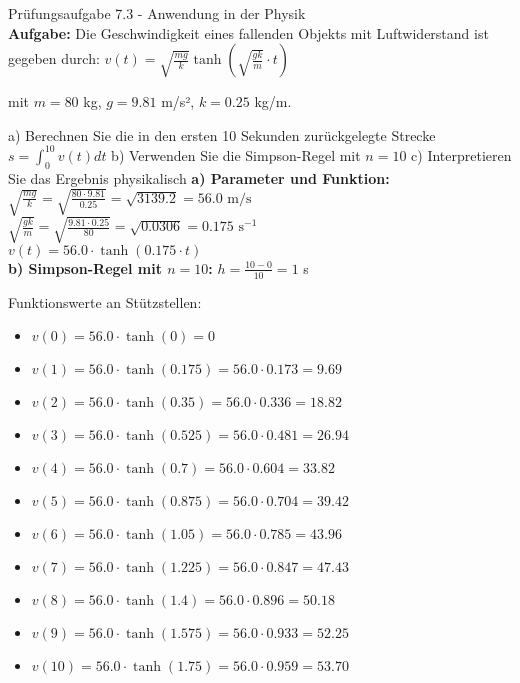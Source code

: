 \begin{example2}{Prüfungsaufgabe 7.3 - Anwendung in der Physik}\\
\textbf{Aufgabe:} Die Geschwindigkeit eines fallenden Objekts mit Luftwiderstand ist gegeben durch:
$v(t) = \sqrt{\frac{mg}{k}} \tanh\left(\sqrt{\frac{gk}{m}} \cdot t\right)$

mit $m = 80$ kg, $g = 9.81$ m/s², $k = 0.25$ kg/m.

a) Berechnen Sie die in den ersten 10 Sekunden zurückgelegte Strecke $s = \int_0^{10} v(t) dt$
b) Verwenden Sie die Simpson-Regel mit $n = 10$
c) Interpretieren Sie das Ergebnis physikalisch
\tcblower
\textbf{a) Parameter und Funktion:}\\
$\sqrt{\frac{mg}{k}} = \sqrt{\frac{80 \cdot 9.81}{0.25}} = \sqrt{3139.2} = 56.0 \text{ m/s}$\\
$\sqrt{\frac{gk}{m}} = \sqrt{\frac{9.81 \cdot 0.25}{80}} = \sqrt{0.0306} = 0.175 \text{ s}^{-1}$
\vspace{2mm}\\
$v(t) = 56.0 \cdot \tanh(0.175 \cdot t)$
\vspace{2mm}\\
\textbf{b) Simpson-Regel mit $n = 10$:}
$h = \frac{10 - 0}{10} = 1$ s

Funktionswerte an Stützstellen:
\begin{itemize}
    \item $v(0) = 56.0 \cdot \tanh(0) = 0$
    \item $v(1) = 56.0 \cdot \tanh(0.175) = 56.0 \cdot 0.173 = 9.69$
    \item $v(2) = 56.0 \cdot \tanh(0.35) = 56.0 \cdot 0.336 = 18.82$
    \item $v(3) = 56.0 \cdot \tanh(0.525) = 56.0 \cdot 0.481 = 26.94$
    \item $v(4) = 56.0 \cdot \tanh(0.7) = 56.0 \cdot 0.604 = 33.82$
    \item $v(5) = 56.0 \cdot \tanh(0.875) = 56.0 \cdot 0.704 = 39.42$
    \item $v(6) = 56.0 \cdot \tanh(1.05) = 56.0 \cdot 0.785 = 43.96$
    \item $v(7) = 56.0 \cdot \tanh(1.225) = 56.0 \cdot 0.847 = 47.43$
    \item $v(8) = 56.0 \cdot \tanh(1.4) = 56.0 \cdot 0.896 = 50.18$
    \item $v(9) = 56.0 \cdot \tanh(1.575) = 56.0 \cdot 0.933 = 52.25$
    \item $v(10) = 56.0 \cdot \tanh(1.75) = 56.0 \cdot 0.959 = 53.70$
\end{itemize}


\end{example2}
